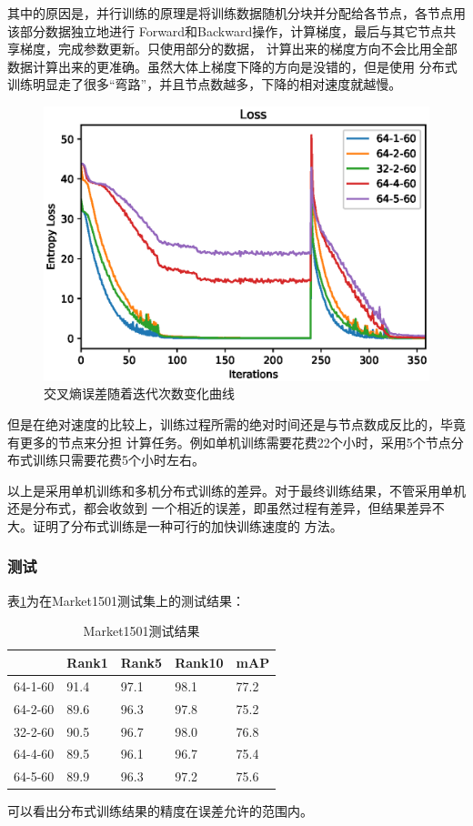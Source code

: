 其中的原因是，并行训练的原理是将训练数据随机分块并分配给各节点，各节点用该部分数据独立地进行
Forward和Backward操作，计算梯度，最后与其它节点共享梯度，完成参数更新。只使用部分的数据，
计算出来的梯度方向不会比用全部数据计算出来的更准确。虽然大体上梯度下降的方向是没错的，但是使用
分布式训练明显走了很多“弯路”，并且节点数越多，下降的相对速度就越慢。
\begin{figure}
\centering
\includegraphics[width=1\textwidth]{figure/loss}
\caption{交叉熵误差随着迭代次数变化曲线}
\label{fig:loss}
\end{figure}
但是在绝对速度的比较上，训练过程所需的绝对时间还是与节点数成反比的，毕竟有更多的节点来分担
计算任务。例如单机训练需要花费22个小时，采用5个节点分布式训练只需要花费5个小时左右。

以上是采用单机训练和多机分布式训练的差异。对于最终训练结果，不管采用单机还是分布式，都会收敛到
一个相近的误差，即虽然过程有差异，但结果差异不大。证明了分布式训练是一种可行的加快训练速度的
方法。

\subsubsection{测试}
表\ref{tab:test}为在Market1501测试集上的测试结果：
\begin{table}[]
\centering
\caption{Market1501测试结果}
\label{tab:test}
\begin{tabular}{@{}lllll@{}}
\toprule
        & Rank1 & Rank5 & Rank10 & mAP  \\ \midrule
64-1-60 & 91.4  & 97.1  & 98.1   & 77.2 \\
64-2-60 & 89.6  & 96.3  & 97.8   & 75.2 \\
32-2-60 & 90.5  & 96.7  & 98.0   & 76.8 \\
64-4-60 & 89.5  & 96.1  & 96.7   & 75.4 \\
64-5-60 & 89.9  & 96.3  & 97.2   & 75.6 \\ \bottomrule
\end{tabular}
\end{table}

可以看出分布式训练结果的精度在误差允许的范围内。
